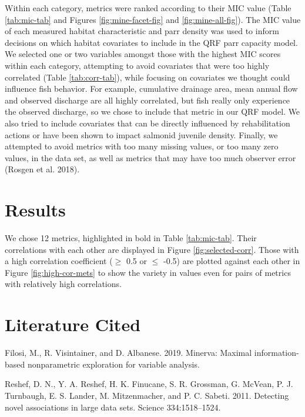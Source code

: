\documentclass[
  12pt,
]{article}
\begin{document}
Within each category, metrics were ranked according to their MIC value (Table \ref{tab:mic-tab} and Figures \ref{fig:mine-facet-fig} and \ref{fig:mine-all-fig}). The MIC value of each measured habitat characteristic and parr density was used to inform decisions on which habitat covariates to include in the QRF parr capacity model. We selected one or two variables amongst those with the highest MIC scores within each category, attempting to avoid covariates that were too highly correlated (Table \ref{tab:corr-tab}), while focusing on covariates we thought could influence fish behavior. For example, cumulative drainage area, mean annual flow and observed discharge are all highly correlated, but fish really only experience the observed discharge, so we chose to include that metric in our QRF model. We also tried to include covariates that can be directly influenced by rehabilitation actions or have been shown to impact salmonid juvenile density. Finally, we attempted to avoid metrics with too many missing values, or too many zero values, in the data set, as well as metrics that may have too much observer error (Rosgen et al. 2018).

\hypertarget{results}{%
\section{Results}\label{results}}

We chose 12 metrics, highlighted in bold in Table \ref{tab:mic-tab}. Their correlations with each other are displayed in Figure \ref{fig:selected-corr}. Those with a high correlation coefficient (\(\geq\) 0.5 or \(\leq\) -0.5) are plotted against each other in Figure \ref{fig:high-cor-mets} to show the variety in values even for pairs of metrics with relatively high correlations.

\newpage

\hypertarget{literature-cited}{%
\section{Literature Cited}\label{literature-cited}}

\hypertarget{refs}{}
\leavevmode\hypertarget{ref-R-minerva}{}%
Filosi, M., R. Visintainer, and D. Albanese. 2019. Minerva: Maximal information-based nonparametric exploration for variable analysis.

\leavevmode\hypertarget{ref-Reshef2011}{}%
Reshef, D. N., Y. A. Reshef, H. K. Finucane, S. R. Grossman, G. McVean, P. J. Turnbaugh, E. S. Lander, M. Mitzenmacher, and P. C. Sabeti. 2011. Detecting novel associations in large data sets. Science 334:1518--1524.
\end{document}
